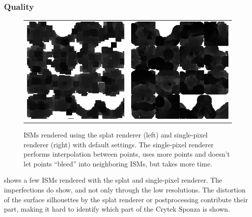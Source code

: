 \subsubsection{Quality}
\label{sec:results:ism:quality}

\begin{figure}[htb]
\centering
  \begin{tabular}{@{}cc@{}}
    \includegraphics[width=.48\textwidth]{screenshots/ism_splat_cropped} &
    \includegraphics[width=.48\textwidth]{screenshots/ism_single_pixel_cropped}
  \end{tabular}
  \caption{ISMs rendered using the splat renderer (left) and single-pixel renderer (right) with default settings. The single-pixel renderer performs interpolation between points, uses more points and doesn't let points ``bleed'' into neighboring ISMs, but takes more time.}
  \label{fig:results:isms}
\end{figure}

 shows a few ISMs rendered with the splat and single-pixel renderer. The imperfections do show, and not only through the low resolutions. The distortion of the surface silhouettes by the splat renderer or postprocessing contribute their part, making it hard to identify which part of the Crytek Sponza is shown.

